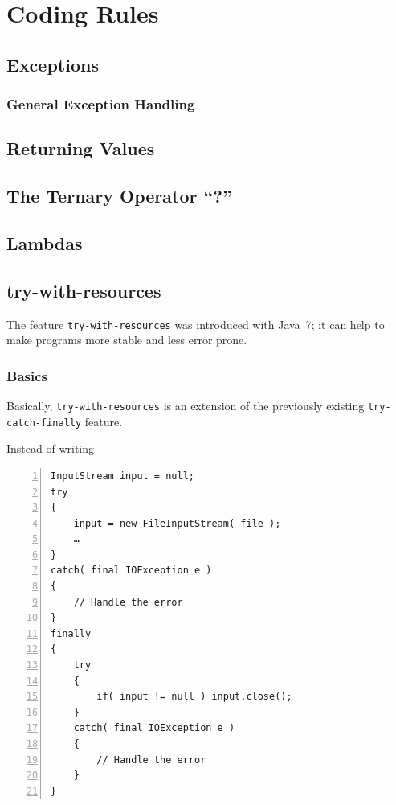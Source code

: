 \documentclass[12pt,a4paper,titlepage, parskip=half, headsepline, footsepline, cleardoubleplain]{scrbook}
\begin{document}
\chapter{Coding Rules}\label{sec:CodingRules}

\section{Exceptions}

\subsection{General Exception Handling}\label{sec:GeneralExceptionHandling}

\section{Returning Values}\label{sec:ReturningValues}

\section{The Ternary Operator “?”}\label{sec:TheTernaryOperator}

\section{Lambdas}\label{sec:Lambdas}

\section{try-with-resources}\label{sec:TryWithResources}

The feature \lstinline|try-with-resources| was introduced with Java~7; it can help to make programs more stable and less error prone.

\subsection{Basics}
Basically, \lstinline|try-with-resources| is an extension of the previously existing \lstinline|try-catch-finally| feature.

Instead of writing
\begin{lstlisting}[numbers=left]
InputStream input = null;
try
{
    input = new FileInputStream( file );
    …
}
catch( final IOException e )
{
    // Handle the error
}
finally
{
    try
    {
        if( input != null ) input.close();
    }
    catch( final IOException e )
    {
        // Handle the error
    }
}
\end{lstlisting}
\end{document}
